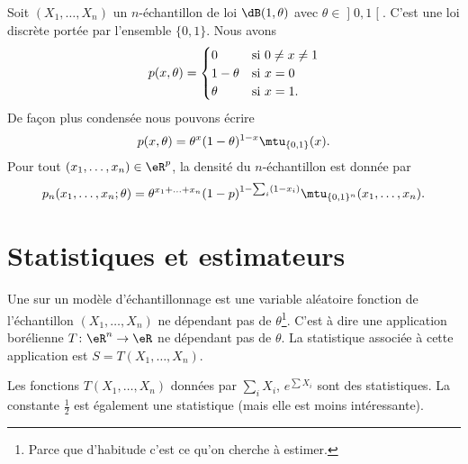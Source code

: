 \begin{example}
    Soit \( (X_1,\ldots,X_n)\) un \( n\)-échantillon de loi \( \dB(1,\theta)\) avec \( \theta\in\mathopen] 0 , 1 \mathclose[\). C'est une loi discrète portée par l'ensemble \( \{ 0,1 \}\). Nous avons
    \begin{equation}
        p(x,\theta)=\begin{cases}
            0    &   \text{si \( 0\neq x\neq 1\)}\\
            1-\theta    &   \text{si \( x=0\)}\\
            \theta    &    \text{si \( x=1\).}
        \end{cases}
    \end{equation}
    De façon plus condensée nous pouvons écrire 
    \begin{equation}
        p(x,\theta)=\theta^x(1-\theta)^{1-x}\mtu_{\{ 0,1 \}}(x).
    \end{equation}
    Pour tout \( (x_1,\ldots,x_n)\in\eR^p\), la densité du \( n\)-échantillon est donnée par
    \begin{equation}
        p_n(x_1,\ldots,x_n;\theta)=\theta^{x_1+\ldots+x_n}(1-p)^{1-\sum_i(1-x_i)}\mtu_{\{ 0,1 \}^n}(x_1,\ldots,x_n).
    \end{equation}
\end{example}

\section{Statistiques et estimateurs}

\begin{definition}
    Une  sur un modèle d'échantillonnage est une variable aléatoire fonction de l'échantillon \( (X_1,\ldots,X_n)\) ne dépendant pas de \( \theta\)\footnote{Parce que d'habitude c'est ce qu'on cherche à estimer.}. C'est à dire une application borélienne \( T\colon \eR^n\to \eR\) ne dépendant pas de \( \theta\). La statistique associée à cette application est $S=T(X_1,\ldots,X_n)$.
\end{definition}

Les fonctions \( T(X_1,\ldots,X_n)\) données par \( \sum_iX_i\), \(  e^{\sum X_i}\) sont des statistiques. La constante \( \frac{ 1 }{2}\) est également une statistique (mais elle est moins intéressante).


